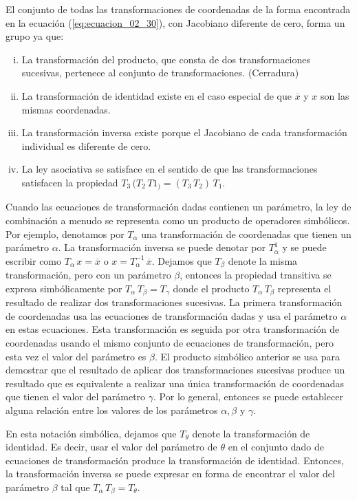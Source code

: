 El conjunto de todas las transformaciones de coordenadas de la forma encontrada en la ecuación (\ref{eq:ecuacion_02_30}), con Jacobiano diferente de cero, forma un grupo ya que:
\begin{enumerate}[(i)]
\item La transformación del producto, que consta de dos transformaciones sucesivas, pertenece al conjunto de transformaciones. (Cerradura)
\item La transformación de identidad existe en el caso especial de que $\overline{x}$ y $x$ son las mismas coordenadas.
\item La transformación inversa existe porque el Jacobiano de cada transformación individual es diferente de cero.
\item La ley asociativa se satisface en el sentido de que las transformaciones satisfacen la propiedad $T_{3} \, (T_{2} \, T1_{)} = (T_{3} \, T_{2}) \, T_{1}$.
\end{enumerate}
Cuando las ecuaciones de transformación dadas contienen un parámetro, la ley de combinación a menudo se representa como un producto de operadores simbólicos. Por ejemplo, denotamos por $T_{\alpha}$ una transformación de coordenadas que tienen un parámetro $\alpha$. La transformación inversa se puede denotar por $T_{\alpha}^{1}$ y se puede escribir como $T_{\alpha} \, x = \overline{x}$ o $x = T_{\alpha}^{-1} \, \overline{x}$. Dejamos que $T_{\beta}$ denote la misma transformación, pero con un parámetro $\beta$, entonces la propiedad transitiva se expresa simbólicamente por $T_{\alpha} \, T_{\beta} = T_{\gamma}$ donde el producto $T_{\alpha} \, T_{\beta}$ representa el resultado de realizar dos transformaciones sucesivas. La primera transformación de coordenadas usa las ecuaciones de transformación dadas y usa el parámetro $\alpha$ en estas ecuaciones. Esta transformación es seguida por otra transformación de coordenadas usando el mismo conjunto de ecuaciones de transformación, pero esta vez el valor del parámetro es $\beta$. El producto simbólico anterior se usa para demostrar que el resultado de aplicar dos transformaciones sucesivas produce un resultado que es equivalente a realizar una única transformación de coordenadas que tienen el valor del parámetro $\gamma$. Por lo general, entonces se puede establecer alguna relación entre los valores de los parámetros $\alpha, \beta$ y $\gamma$.
\par
En esta notación simbólica, dejamos que $T_\theta$ denote la transformación de identidad. Es decir, usar el valor del parámetro de $\theta$ en el conjunto dado de ecuaciones de transformación produce la transformación de identidad. Entonces, la transformación inversa se puede expresar en forma de encontrar el valor del parámetro $\beta$ tal que $T_{\alpha} \, T_{\beta} = T_{\theta}$.


